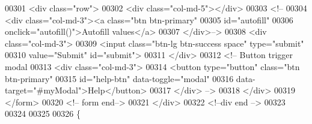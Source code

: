 \begin{DoxyCode}
00301                 <div class="row">
00302                     <div class="col-md-5"></div>
00303                     <!--
00304                     <div class="col-md-3"><a class="btn btn-primary"
00305                     id="autofill"
00306                             onclick="autofill()">Autofill values</a>
00307                     </div>-->
00308                     <div class="col-md-3">
00309                         <input class="btn-lg btn-success space" type="submit"
00310                             value="Submit" id="submit">
00311                     </div>
00312                     <!-- Button trigger modal
00313                     <div class="col-md-3">
00314                     <button type="button" class="btn btn-primary"
00315                         id="help-btn" data-toggle="modal"
00316                         data-target="#myModal">Help</button>
00317                     </div> -->
00318                 </div>
00319            </form>
00320                <!-- form end-->
00321        </div>
00322        <!--div end  -->
00323 
00324 
00325 
00326         \{%
\end{DoxyCode}
